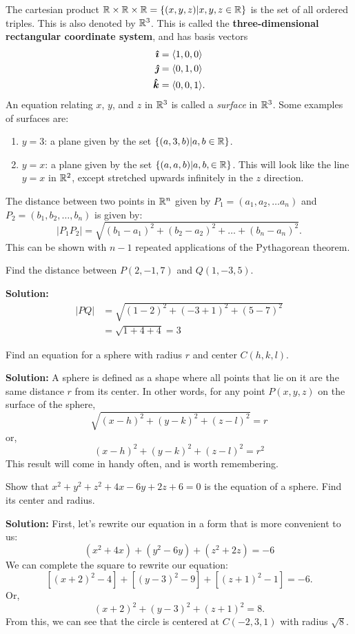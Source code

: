 The cartesian product \(\mathbb{R} \times \mathbb{R} \times \mathbb{R} = \{(x,y,z)|x,y,z\in \mathbb{R}\}\) is the set of all ordered triples. This is also denoted by \(\mathbb{R}^3\). This is called the \textbf{three-dimensional rectangular coordinate system}, and has basis vectors \begin{align*}
    \boldsymbol{\hat{\imath}} &= \langle 1,0,0\rangle \\
    \boldsymbol{\hat{\jmath}} &= \langle 0,1,0\rangle \\
    \boldsymbol{\hat{k}} &= \langle 0,0,1\rangle.
\end{align*}
An equation relating \(x\), \(y\), and \(z\) in \(\mathbb{R}^3\) is called a \textit{surface} in \(\mathbb{R}^3\). Some examples of surfaces are:
\begin{enumerate}
    \item \(y=3\): a plane given by the set \(\{(a,3,b)|a,b\in \mathbb{R}\}\). 
    \item \(y=x\): a plane given by the set \(\{(a,a,b)|a,b,\in \mathbb{R}\}\). This will look like the line \(y=x\) in \(\mathbb{R}^2\), except stretched upwards infinitely in the \(z\) direction.
\end{enumerate}
The distance between two points in \(\mathbb{R}^n\) given by \(P_1=(a_1, a_2, \dots a_n)\) and \(P_2=(b_1,b_2,\dots, b_n)\) is given by:
\[ |P_1P_2|=\sqrt{(b_1-a_1)^2+(b_2-a_2)^2+\dots+(b_n-a_n)^2}. \]
This can be shown with \(n-1\) repeated applications of the Pythagorean theorem. 
\begin{example}
    Find the distance between \(P(2,-1,7)\) and \(Q(1,-3,5)\). \par \textbf{Solution:}
    \begin{align*}
        |PQ|&=\sqrt{(1-2)^2+(-3+1)^2+(5-7)^2} \\
        &= \sqrt{1+4+4} = 3
    \end{align*}
\end{example}
\begin{example}
    Find an equation for a sphere with radius \(r\) and center \(C(h,k,l)\). \par 
    \textbf{Solution:} A sphere is defined as a shape where all points that lie on it are the same distance \(r\) from its center. In other words, for any point \(P(x,y,z)\) on the surface of the sphere,
    \[ \sqrt{(x-h)^2+(y-k)^2+(z-l)^2}=r \]
    or,
    \[ (x-h)^2+(y-k)^2+(z-l)^2=r^2 \]
    This result will come in handy often, and is worth remembering.
\end{example}
\begin{example}
    Show that \(x^2+y^2+z^2+4x-6y+2z+6=0\) is the equation of a sphere. Find its center and radius. \par \textbf{Solution:} First, let's rewrite our equation in a form that is more convenient to us:
    \[ (x^2+4x)+(y^2-6y)+(z^2+2z)=-6 \]
    We can complete the square to rewrite our equation:
    \[ [(x+2)^2-4]+[(y-3)^2-9]+[(z+1)^2-1]=-6. \]
    Or,
    \[ (x+2)^2+(y-3)^2+(z+1)^2=8. \]
    From this, we can see that the circle is centered at \(C(-2,3,1)\) with radius \(\sqrt 8\).
\end{example}
